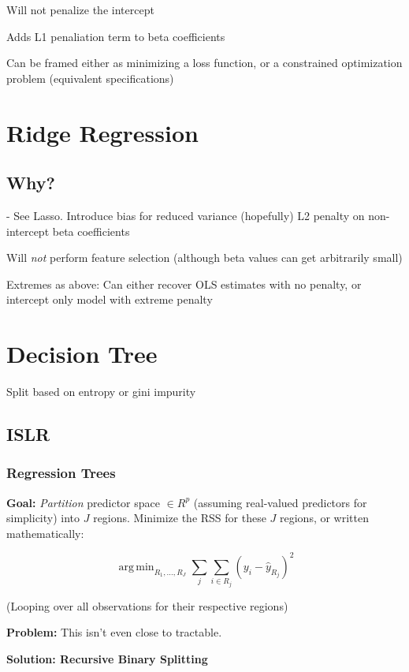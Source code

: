 \documentclass{article}
\DeclareMathOperator*{\argmin}{arg\,min}
\begin{document}
Will not penalize the intercept

Adds L1 penaliation term to beta coefficients

Can be framed either as minimizing a loss function, or a constrained optimization problem (equivalent specifications)

\section{Ridge Regression}

\subsection{Why?}
	- See Lasso. Introduce bias for reduced variance (hopefully)
L2 penalty on non-intercept beta coefficients

Will \textit{not} perform feature selection (although beta values can get arbitrarily small)

Extremes as above: Can either recover OLS estimates with no penalty, or intercept only model with extreme penalty

\section{Decision Tree}

Split based on entropy or gini impurity

\subsection{ISLR}

\subsubsection{Regression Trees}

\textbf{Goal:} \textit{Partition} predictor space $\in R^p$ (assuming real-valued predictors for simplicity) into $J$ regions. Minimize the RSS for these $J$ regions, or written mathematically:

\begin{equation*}
	\argmin_{R_1, \ldots, R_J} \sum_j \sum_{i \in R_j} (y_i - \hat{y}_{R_j})^2
\end{equation*}

(Looping over all observations for their respective regions)

\textbf{Problem:} This isn't even close to tractable.

\textbf{Solution: Recursive Binary Splitting}
\end{document}
